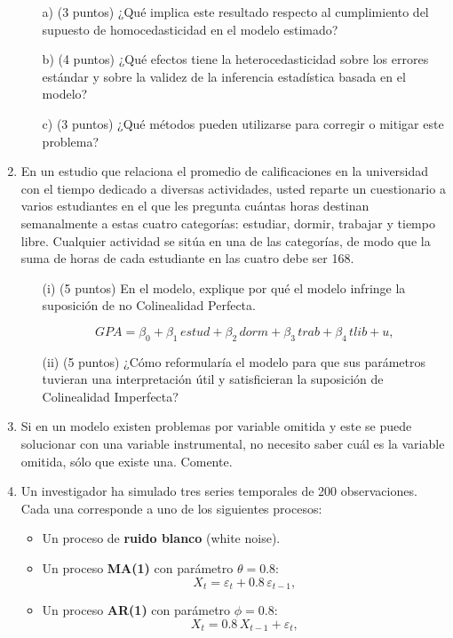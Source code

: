 \documentclass[10pt,a4paper]{article}
\begin{document}
\begin{enumerate}
\begin{enumerate}
  \item[a)] (3 puntos) ¿Qué implica este resultado respecto al cumplimiento del supuesto de homocedasticidad en el modelo estimado?
  \item[b)] (4 puntos) ¿Qué efectos tiene la heterocedasticidad sobre los errores estándar y sobre la validez de la inferencia estadística basada en el modelo?
  \item[c)] (3 puntos) ¿Qué métodos pueden utilizarse para corregir o mitigar este problema?
\end{enumerate}

    \item En un estudio que relaciona el promedio de calificaciones en la universidad con el tiempo dedicado a diversas actividades, usted reparte un cuestionario a varios estudiantes en el que les pregunta cuántas horas destinan semanalmente a estas cuatro categorías: estudiar, dormir, trabajar y tiempo libre. Cualquier actividad se sitúa en una de las categorías, de modo que la suma de horas de cada estudiante en las cuatro debe ser 168.

\begin{enumerate}
    \item[(i)] (5 puntos) En el modelo, explique por qué el modelo infringe la suposición de no Colinealidad Perfecta.

    \[
        GPA = \beta_0 + \beta_1 \, estud + \beta_2 \, dorm + \beta_3 \, trab + \beta_4 \, tlib + u,
    \]

    \item[(ii)] (5 puntos) ¿Cómo reformularía el modelo para que sus parámetros tuvieran una interpretación  útil y satisficieran la suposición de Colinealidad Imperfecta?

\end{enumerate}

    
    \item Si en un modelo existen problemas por variable omitida y este se puede solucionar con una variable instrumental, no necesito saber cuál es la variable omitida, sólo que existe una. Comente.\\

    
    \item Un investigador ha simulado tres series temporales de 200 observaciones. 
Cada una corresponde a uno de los siguientes procesos:

\begin{itemize}
    \item Un proceso de \textbf{ruido blanco} (white noise).
    \item Un proceso \textbf{MA(1)} con parámetro $\theta = 0.8$:
    \[
        X_t = \varepsilon_t + 0.8\,\varepsilon_{t-1},
    \]
    \item Un proceso \textbf{AR(1)} con parámetro $\phi = 0.8$:
    \[
        X_t = 0.8\,X_{t-1} + \varepsilon_t,
    \]
\end{itemize}


\end{enumerate}
\end{document}

